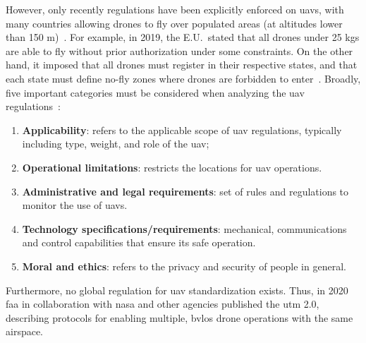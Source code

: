 However, only recently regulations have been explicitly enforced on \glspl{uav},
with many countries allowing drones to fly over populated areas (at altitudes
lower than 150 m)~\cite{nassi2021sok}. For example, in 2019, the E.U.~stated that all drones under
25 kgs are able to fly without prior authorization under some constraints. On
the other hand, it imposed that all drones must register in their respective
states, and that each state must define no-fly zones where drones are
forbidden to enter~\cite{Ullah2020UAV5gEULegisl}. Broadly, five important categories must be considered when
analyzing the \gls{uav}
regulations~\cite{fotouhi2019UAVCellularCommSurvey,stocker2017UAVRegulationsReview}:

\begin{enumerate}
\item \textbf{Applicability}: refers to the applicable scope of \gls{uav} regulations,
  typically including type, weight, and role of the \gls{uav}; 
\item \textbf{Operational limitations}: restricts the locations for \gls{uav} operations.
\item \textbf{Administrative and legal requirements}: set of rules and
  regulations to monitor the use of \glspl{uav}.
\item \textbf{Technology specifications/requirements}: mechanical,
  communications and control capabilities that ensure its safe operation.
\item \textbf{Moral and ethics}: refers to the privacy and security of people in
  general.
\end{enumerate}

Furthermore, no global regulation for \gls{uav} standardization exists. Thus, in
2020 \gls{faa} in collaboration with \gls{nasa} and other agencies published the
\gls{utm} 2.0, describing protocols for enabling multiple, \gls{bvlos}
drone operations with the same airspace.

